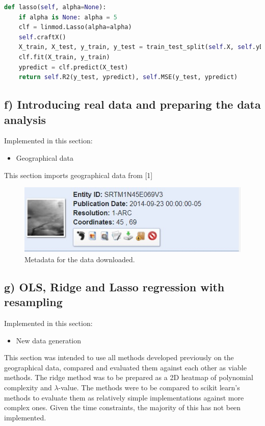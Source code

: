 \documentclass[a4paper, UKenglish]{article}
\newcommand{\0}{\mathbf{0}}
\newcommand{\1}{\mathbf{1}}
\begin{document}
\begin{lstlisting}[language=python]
def lasso(self, alpha=None):
    if alpha is None: alpha = 5
    clf = linmod.Lasso(alpha=alpha)
    self.craftX()
    X_train, X_test, y_train, y_test = train_test_split(self.X, self.yData)
    clf.fit(X_train, y_train)
    ypredict = clf.predict(X_test)
    return self.R2(y_test, ypredict), self.MSE(y_test, ypredict)
\end{lstlisting}

\subsection{f) Introducing real data and preparing the data analysis}
Implemented in this section:
\begin{itemize}
\item Geographical data
\end{itemize}

This section imports geographical data from [1]

\begin{figure}[H]
        \centering 
        \includegraphics[scale=0.75]{../Source_code/geodata/SRTM1N45E069V3.jpg} 
        \caption{Metadata for the data downloaded.}
        \label{fig:geodata metadata}
\end{figure}

\subsection{g) OLS, Ridge and Lasso regression with resampling}
Implemented in this section:
\begin{itemize}
\item New data generation
\end{itemize}

This section was intended to use all methods developed previously on the geographical data, compared and evaluated them against each other as viable methods. The ridge method was to be prepared as a 2D heatmap of polynomial complexity and $\lambda$-value. The methods were to be compared to scikit learn's methods to evaluate them as relatively simple implementations against more complex ones. Given the time constraints, the majority of this has not been implemented. 
\end{document}
